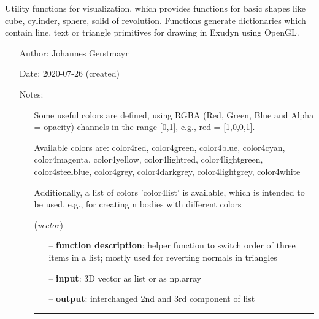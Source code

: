 \begin{itemize}[leftmargin=1.4cm]
\begin{itemize}[leftmargin=0.5cm]
\begin{itemize}[leftmargin=1.4cm]
\begin{itemize}[leftmargin=0.5cm]
%
\label{sec:module:graphicsDataUtilities}
 	Utility functions for visualization, which provides functions for basic shapes
			like cube, cylinder, sphere, solid of revolution. Functions generate dictionaries
			which contain line, text or triangle primitives for drawing in Exudyn using OpenGL.
\begin{itemize}[leftmargin=1.4cm]
\setlength{\itemindent}{-1.4cm}
\item[]Author:    Johannes Gerstmayr
\item[]Date:      2020-07-26 (created)
\item[]Notes:
\vspace{-22pt}\begin{itemize}[leftmargin=0.5cm]
\setlength{\itemindent}{-0.5cm}
\item[] 	Some useful colors are defined, using RGBA (Red, Green, Blue and Alpha = opacity) channels			in the range [0,1], e.g., red = [1,0,0,1].
\item[]			Available colors are: color4red, color4green, color4blue, color4cyan, color4magenta, color4yellow, color4lightred, color4lightgreen, color4steelblue, color4grey, color4darkgrey, color4lightgrey, color4white
\item[]			Additionally, a list of colors 'color4list' is available, which is intended to be used, e.g., for creating n bodies with different colors
\ei
\ei
\begin{flushleft}
\label{sec:graphicsDataUtilities:SwitchTripletOrder}
({\it vector})
\end{flushleft}
\setlength{\itemindent}{0.7cm}
\begin{itemize}[leftmargin=0.7cm]
  \item[--]  {\bf function description}: helper function to switch order of three items in a list; mostly used for reverting normals in triangles  \item[--]  {\bf input}: 3D vector as list or as np.array  \item[--]  {\bf output}: interchanged 2nd and 3rd component of list\vspace{12pt}\end{itemize}
%
\noindent\rule{8cm}{0.75pt}\vspace{1pt} \\ 
\begin{flushleft}
\label{sec:graphicsDataUtilities:MoveGraphicsData}

\end{flushleft}
\end{itemize}
\end{itemize}
\end{itemize}
\end{itemize}
\end{itemize}
\end{itemize}
